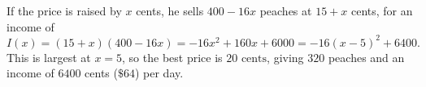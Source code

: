 If the price is raised by $x$ cents, he sells $400-16x$ peaches at $15+x$ cents, for an income of
\[
I(x)=(15+x)(400-16x)=-16x^2+160x+6000=-16(x-5)^2+6400 .
\]
This is largest at $x=5$, so the best price is $\boxed{20\text{ cents}}$, giving $320$ peaches and an income of $6400$ cents ($\$64$) per day.
